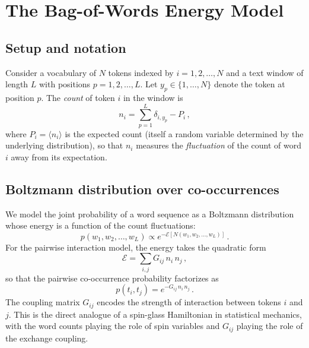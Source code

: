 \documentclass[11pt]{article}
\begin{document}
\section{The Bag-of-Words Energy Model}\label{sec:energy}

\subsection{Setup and notation}

Consider a vocabulary of $N$ tokens indexed by $i = 1, 2, \ldots, N$ and a text window of length $L$ with positions $p = 1, 2, \ldots, L$. Let $y_p \in \{1, \ldots, N\}$ denote the token at position $p$. The \emph{count} of token $i$ in the window is
\begin{equation}\label{eq:count}
    n_i = \sum_{p=1}^{L} \delta_{i, y_p} - P_i\,,
\end{equation}
where $P_i = \langle n_i \rangle$ is the expected count (itself a random variable determined by the underlying distribution), so that $n_i$ measures the \emph{fluctuation} of the count of word $i$ away from its expectation.

\subsection{Boltzmann distribution over co-occurrences}

We model the joint probability of a word sequence as a Boltzmann distribution whose energy is a function of the count fluctuations:
\begin{equation}\label{eq:boltzmann}
    p(w_1, w_2, \ldots, w_L) \propto e^{-\mathcal{E}[N(w_1, w_2, \ldots, w_L)]}\,.
\end{equation}
For the pairwise interaction model, the energy takes the quadratic form
\begin{equation}\label{eq:pairwise}
    \mathcal{E} = \sum_{i,j} G_{ij}\, n_i\, n_j\,,
\end{equation}
so that the pairwise co-occurrence probability factorizes as
\begin{equation}\label{eq:pair-prob}
    p(t_i, t_j) = e^{-G_{ij}\, n_i\, n_j}\,.
\end{equation}
The coupling matrix $G_{ij}$ encodes the strength of interaction between tokens $i$ and $j$. This is the direct analogue of a spin-glass Hamiltonian in statistical mechanics, with the word counts playing the role of spin variables and $G_{ij}$ playing the role of the exchange coupling.
\end{document}
